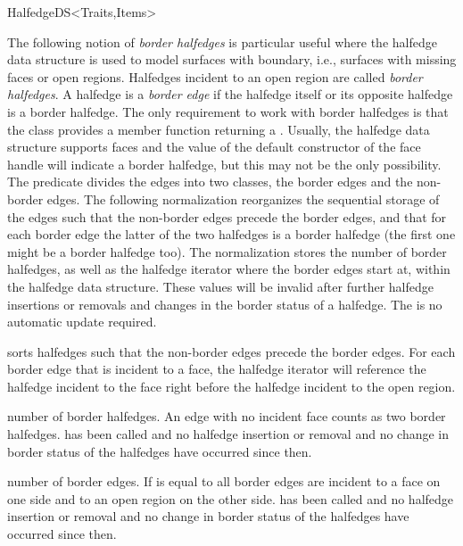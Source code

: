 \begin{ccRefConcept}{HalfedgeDS<Traits,Items>}



\begin{ccAdvanced}
  
The following notion of {\em border halfedges\/} is particular useful
where the halfedge data structure is used to model surfaces with
boundary, i.e., surfaces with missing faces or open regions. Halfedges
incident to an open region are called {\em border halfedges}. A
halfedge is a {\em border edge\/} if the halfedge itself or its
opposite halfedge is a border halfedge. The only requirement to work
with border halfedges is that the
 class provides a member function 
returning a . Usually, the halfedge data structure
supports faces and the value of the default constructor of the face
handle will indicate a border halfedge, but this may not be the only
possibility. The  predicate divides the edges into
two classes, the border edges and the non-border edges. The
following normalization reorganizes the sequential storage of the
edges such that the non-border edges precede the border edges, and
that for each border edge the latter of the two halfedges is a
border halfedge (the first one might be a border halfedge too). The
normalization stores the number of border halfedges, as well as the
halfedge iterator where the border edges start at, within the
halfedge data structure.  These values will be invalid after further
halfedge insertions or removals and changes in the border status of 
a halfedge. The is no automatic update required.


    {sorts halfedges such that the non-border edges precede the
     border edges. For each border edge that is incident to a face,
     the halfedge iterator will reference the halfedge incident to the
     face right before the halfedge incident to the open region.}

    {number of border halfedges. An edge with no incident face
      counts as two border halfedges.
    \ccPrecond {} has been called and no
    halfedge insertion or removal and no change in border
    status of the halfedges have occurred since then.}

    {number of border edges. If  is equal
    to  all border edges are incident to
    a face on one side and to an open region on the other side.
    \ccPrecond {} has been called and no
    halfedge insertion or removal and no change in border
    status of the halfedges have occurred since then.}


\end{ccAdvanced}
\end{ccRefConcept}
